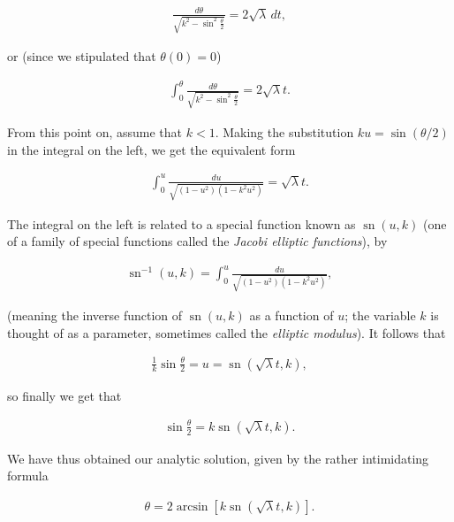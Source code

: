 \documentclass[11pt]{report}
\theoremstyle{plain}
\theoremstyle{definition}
\begin{document}
\begin{align*}
\frac{d\theta}{\sqrt{k^2-\sin^2 \tfrac{\theta}{2}}} = 2\sqrt{\lambda} \,dt,
\end{align*}

or (since we stipulated that $\theta(0)=0$)

\begin{equation*} \tag{23}\label{eq:ellipticintegral-trig}
\begin{split}
\int_0^\theta \frac{d\theta}{\sqrt{k^2-\sin^2 \tfrac{\theta}{2}}} = 2\sqrt{\lambda} t.
\end{split}
\end{equation*}

From this point on, assume that $k<1$. Making the
substitution $ku = \sin(\theta/2)$ in the integral on
the left, we get the equivalent form

\begin{align*}
\int_0^u \frac{du}{\sqrt{(1-u^2)(1-k^2 u^2)}} = \sqrt{\lambda} t.
\end{align*}

The integral on the left is related to a special
function known as $\operatorname{sn}(u,k)$ (one of a
family of special functions called the \emph{Jacobi
elliptic functions}), by

\begin{align*}
\operatorname{sn}^{-1}(u,k) = \int_0^u \frac{du}{\sqrt{(1-u^2)(1-k^2 u^2)}},
\end{align*}

(meaning the inverse function of
$\operatorname{sn}(u,k)$ as a function of $u$; the
variable $k$ is thought of as a parameter, sometimes
called the \emph{elliptic modulus}). It follows that

\begin{align*}
\frac{1}{k}\sin\frac{\theta}{2} = u = \operatorname{sn}(\sqrt{\lambda}t ,k),
\end{align*}

so finally we get that

\begin{equation*} \tag{24}\label{eq:pendulum-almostfinal}
\begin{split}
\sin\frac{\theta}{2} = k \operatorname{sn}(\sqrt{\lambda}t ,k).
\end{split}
\end{equation*}

We have thus obtained our analytic solution, given by
the rather intimidating formula

\begin{align*}
\theta  = 2 \arcsin \left[k \operatorname{sn}(\sqrt{\lambda}t ,k)\right].
\end{align*}
\end{document}
